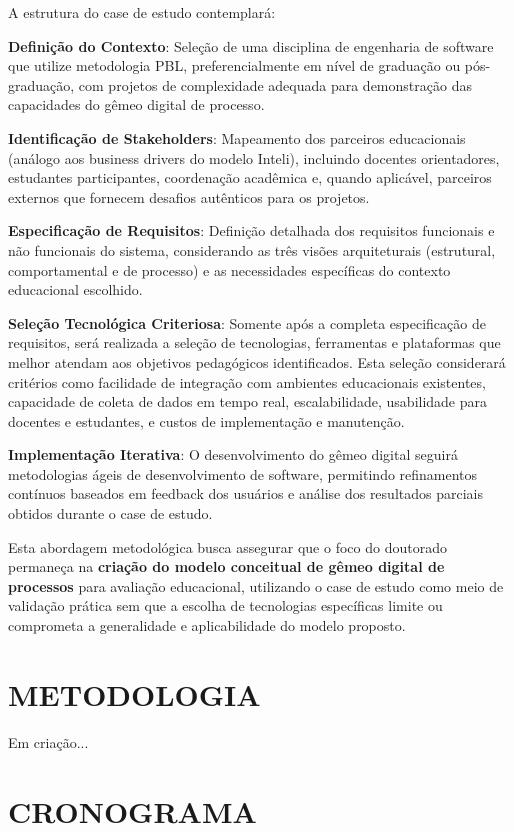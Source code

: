\documentclass[12pt,a4paper]{article}
\begin{document}
A estrutura do case de estudo contemplará:

\textbf{Definição do Contexto}: Seleção de uma disciplina de engenharia de software que utilize metodologia PBL, preferencialmente em nível de graduação ou pós-graduação, com projetos de complexidade adequada para demonstração das capacidades do gêmeo digital de processo.

\textbf{Identificação de Stakeholders}: Mapeamento dos parceiros educacionais (análogo aos business drivers do modelo Inteli), incluindo docentes orientadores, estudantes participantes, coordenação acadêmica e, quando aplicável, parceiros externos que fornecem desafios autênticos para os projetos.

\textbf{Especificação de Requisitos}: Definição detalhada dos requisitos funcionais e não funcionais do sistema, considerando as três visões arquiteturais (estrutural, comportamental e de processo) e as necessidades específicas do contexto educacional escolhido.

\textbf{Seleção Tecnológica Criteriosa}: Somente após a completa especificação de requisitos, será realizada a seleção de tecnologias, ferramentas e plataformas que melhor atendam aos objetivos pedagógicos identificados. Esta seleção considerará critérios como facilidade de integração com ambientes educacionais existentes, capacidade de coleta de dados em tempo real, escalabilidade, usabilidade para docentes e estudantes, e custos de implementação e manutenção.

\textbf{Implementação Iterativa}: O desenvolvimento do gêmeo digital seguirá metodologias ágeis de desenvolvimento de software, permitindo refinamentos contínuos baseados em feedback dos usuários e análise dos resultados parciais obtidos durante o case de estudo.

Esta abordagem metodológica busca assegurar que o foco do doutorado permaneça na \textbf{criação do modelo conceitual de gêmeo digital de processos} para avaliação educacional, utilizando o case de estudo como meio de validação prática sem que a escolha de tecnologias específicas limite ou comprometa a generalidade e aplicabilidade do modelo proposto.

\section{METODOLOGIA}

Em criação...

\section{CRONOGRAMA}
\end{document}

